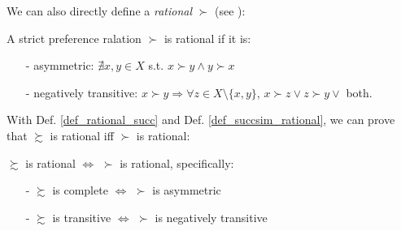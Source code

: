 We can also directly define a \textit{rational} $\succ$ (see \citet[Page 19-21]{kreps1990acourse}):
\begin{definition}\label{def_rational_succ}
    A strict preference ralation $\succ$ is rational if it is:
    \begin{enumerate}
        \item[-] asymmetric: $\nexists x,y\in X$ s.t. $x\succ y \land y\succ x$
        \item[-] negatively transitive: $x\succ y \Rightarrow \forall z\in X\setminus\{x,y\}$, $x\succ z\lor z\succ y \lor$ both. 
    \end{enumerate}
\end{definition}

With Def. \ref{def_rational_succ} and Def. \ref{def_succsim_rational}, we can prove that $\succsim$ is rational iff $\succ$ is rational:
\begin{theorem}
    $\succsim$ is rational $\Leftrightarrow$ $\succ$ is rational, specifically:
    \begin{enumerate}
        \item[-] $\succsim$ is complete $\Leftrightarrow$ $\succ$ is asymmetric
        \item[-] $\succsim$ is transitive $\Leftrightarrow$ $\succ$ is negatively transitive
    \end{enumerate}
\end{theorem}

